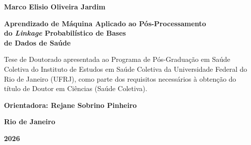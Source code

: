 \documentclass[12pt,a4paper,openany]{book}
\begin{document}

\newpage

\thispagestyle{empty}

\begin{center}

{\large \bf Marco Elisio Oliveira Jardim}

\vspace{40pt}

{\Large \bf Aprendizado de M\'aquina Aplicado ao P\'os-Processamento\\do \textit{Linkage} Probabil\'istico de Bases\\de Dados de Sa\'ude}

\vspace{50pt}

\begin{flushright}
\parbox{10.3cm}{Tese de Doutorado apresentada ao Programa de P\'os-Gradua\c{c}\~ao em Sa\'ude Coletiva do Instituto de Estudos em Sa\'ude Coletiva da Universidade Federal do Rio de Janeiro (UFRJ), como parte dos requisitos necess\'arios \`a obten\c{c}\~ao do t\'itulo de Doutor em Ci\^encias (Sa\'ude Coletiva).\par
\vspace{18pt}\par
{\large \bf Orientadora: Rejane Sobrino Pinheiro}\par
\vspace{12pt}\par}
\end{flushright}

\vspace{\fill}

\textbf{Rio de Janeiro}

\textbf{2026}

\end{center}





\newpage
\mbox{}\vspace{5cm}
\end{document}
